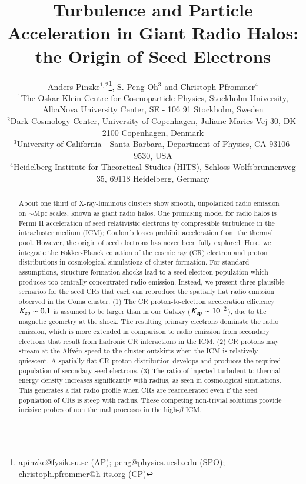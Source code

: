 \documentclass[fleqn,usenatbib,useAMS]{mnras}
\title[Origin of Seed Electrons]{Turbulence and Particle Acceleration in Giant Radio Halos: the Origin of Seed Electrons}
\author[A. Pinzke, S. Peng Oh and C. Pfrommer] 
{Anders Pinzke$^{1,2}$\thanks{apinzke@fysik.su.se (AP); peng@physics.ucsb.edu (SPO); christoph.pfrommer@h-its.org (CP)}, S. Peng Oh$^{3}$ and Christoph Pfrommer$^{4}$\footnotemark[1]\\
$^{1}$The Oskar Klein Centre for Cosmoparticle Physics, Stockholm University, AlbaNova University Center, SE - 106 91
  Stockholm, Sweden\\
$^{2}$Dark Cosmology Center, University of Copenhagen,
  Juliane Maries Vej 30, DK-2100 Copenhagen, Denmark\\
  $^{3}$University of California - Santa Barbara,
  Department of Physics, CA 93106-9530, USA\\
$^{4}$Heidelberg Institute for Theoretical Studies
  (HITS), Schloss-Wolfsbrunnenweg 35, 69118 Heidelberg, Germany}
\begin{document}
\pagerange{\pageref{firstpage}--\pageref{lastpage}} 
\maketitle
\label{firstpage}



 
\begin{abstract}
  About one third of X-ray-luminous clusters show smooth, unpolarized
  radio emission on $\sim$Mpc scales, known as giant radio halos. One
  promising model for radio halos is Fermi II acceleration of seed
  relativistic electrons by compressible turbulence in the
  intracluster medium (ICM); Coulomb losses prohibit acceleration from
  the thermal pool. However, the origin of seed electrons has never
  been fully explored. Here, we integrate the Fokker-Planck equation
  of the cosmic ray (CR) electron and proton distributions in
  cosmological simulations of cluster formation. For standard
  assumptions, structure formation shocks lead to a seed electron
  population which produces too centrally concentrated radio
  emission. Instead, we present three plausible scenarios for the seed
  CRs that each can reproduce the spatially flat radio emission
  observed in the Coma cluster. (1) The CR proton-to-electron
  acceleration efficiency $K_{\mathrm{ep}} \sim 0.1$ is assumed to be
  larger than in our Galaxy ($K_{\mathrm{ep}} \sim 10^{-2}$), due to the
  magnetic geometry at the shock. The resulting primary electrons
  dominate the radio emission, which is more extended in comparison to
  radio emission from secondary electrons that result from hadronic CR
  interactions in the ICM. (2) CR protons may stream at the Alfv{\'e}n
  speed to the cluster outskirts when the ICM is relatively
  quiescent. A spatially flat CR proton distribution develops and
  produces the required population of secondary seed electrons. (3)
  The ratio of injected turbulent-to-thermal energy density increases
  significantly with radius, as seen in cosmological simulations. This
  generates a flat radio profile when CRs are reaccelerated even if
  the seed population of CRs is steep with radius. These competing
  non-trivial solutions provide incisive probes of non thermal
  processes in the high-$\beta$ ICM.
\end{abstract} 

\end{document}
